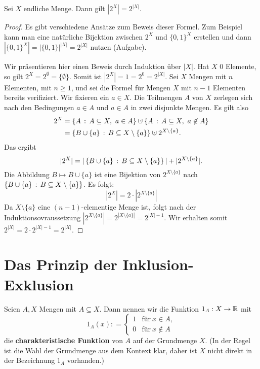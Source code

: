 \begin{thm}
	Sei $X$ endliche Menge. Dann gilt $|2^X|=2^{|X|}$. 
\end{thm} 
\begin{proof} 
	Es gibt verschiedene Ansätze zum Beweis dieser Formel. Zum Beispiel kann man eine natürliche Bijektion zwischen  $2^X$ und $\{0,1\}^X$ erstellen und dann $|\{0,1\}^X| = |\{0,1\}|^{|X|} = 2^{|X|}$ nutzen (Aufgabe). 
	
	Wir präsentieren hier einen Beweis durch Induktion über $|X|$. Hat $X$ $0$ Elemente, so gilt $2^X = 2^\emptyset = \{\emptyset\}$. Somit ist $|2^X| = 1 = 2^0 = 2^{|X|}$. Sei $X$ Mengen mit $n$ Elementen, mit $n \ge 1$, und sei die Formel für Mengen $X$ mit $n-1$ Elementen bereits verifiziert. Wir fixieren ein $a \in X$. Die Teilmengen $A$ von $X$ zerlegen sich nach den Bedingungen $a \in A$ und $a \in A$ in zwei disjunkte Mengen. Es gilt also
	\begin{align*}
			2^X & = \setcond{A}{A \subseteq X, \ a \in A} \cupdot \setcond{A}{A \subseteq X, \ a \not\in A}
			\\ & = \setcond{B \cup \{a\}}{B \subseteq X \setminus \{a\}} \cupdot 2^{X \setminus \{a\}}. 
	\end{align*}
	Das ergibt
	\[
		|2^X| = |\left\{ B \cup \{a\} \,:\, B \subseteq X \setminus \{a\} \right\}| + | 2^{X \setminus \{a\}}|. 
	\]
	Die Abbildung $B \mapsto B \cup \{a\}$ ist eine Bijektion von $2^{X \setminus \{a\}}$ nach $\left\{ B \cup \{a\} \,:\, B \subseteq X \setminus \{a\} \right\}$. Es folgt: 
	\[
		|2^X| = 2 \cdot |2^{X \setminus \{a\}}|
	\]
	Da $X \setminus \{a\}$ eine $(n-1)$-elementige Menge ist, folgt nach der Induktionsovraussetzung $|2^{X \setminus \{a\}}| = 2^{|X \setminus \{a\}|} = 2^{|X|-1}$. Wir erhalten somit $2^{|X|} = 2 \cdot 2^{|X|-1} = 2^{|X|}$. 
\end{proof} 

\section{Das Prinzip der Inklusion-Exklusion} 

\begin{defn}
	Seien $A,X$ Mengen mit $A \subseteq X$. Dann nennen wir die Funktion $1_A : X \to \mathbb{R}$ mit 
	\[
		1_A(x): = \begin{cases}
				1 &  \text{für} \ x \in A, 
			\\	0 & \text{für} \ x \not\in A
			\end{cases} 
	\]
	die \textbf{charakteristische Funktion} von $A$ auf der Grundmenge $X$. (In der Regel ist die Wahl der Grundmenge aus dem Kontext klar, daher ist $X$ nicht direkt in der Bezeichnung $1_A$ vorhanden.)
\end{defn} 

